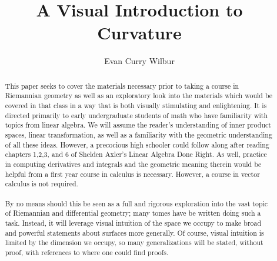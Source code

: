 \documentclass[]{article}
\title{A Visual Introduction to Curvature}
\author{Evan Curry Wilbur}
\newcommand\<{\ensuremath{\left\langle}}
\renewcommand\>{\ensuremath{\right\rangle}}
\theoremstyle{definition}
\theoremstyle{definition}
\begin{document}
	\maketitle
	\begin{abstract}
		\indent
		This paper seeks to cover the materials necessary prior to taking a course in Riemannian geometry as well as an exploratory look into the materials which would be covered in that class in a way that is both visually stimulating and enlightening. It is directed primarily to early undergraduate students of math who have familiarity with topics from linear algebra. We will assume the reader's understanding of inner product spaces, linear transformation, as well as a familiarity with the geometric understanding of all these ideas. However, a precocious high schooler could follow along after reading chapters 1,2,3, and 6 of Shelden Axler's Linear Algebra Done Right. As well, practice in computing derivatives and integrals and the geometric meaning therein would be helpful from a first year course in calculus is necessary. However, a course in vector calculus is not required.
		\\
		\\
		\indent
		By no means should this be seen as a full and rigorous exploration into the vast topic of Riemannian and differential geometry; many tomes have be written doing such a task. Instead, it will leverage visual intuition of the space we occupy to make broad and powerful statements about surfaces more generally. Of course, visual intuition is limited by the dimension we occupy, so many generalizations will be stated, without proof, with references to where one could find proofs.
	\end{abstract}
	
\end{document}
